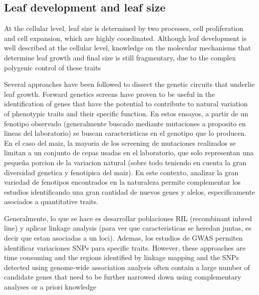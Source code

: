 \documentclass[a4paper,10pt]{article}
\begin{document}
\subsection{Leaf development and leaf size}

At the cellular level, leaf size is determined by two processes, cell proliferation and cell expansion, which are highly coordinated.
Although leaf development is well described at the cellular level, knowledge on the molecular mechanisms that determine leaf growth and final size is still fragmentary, due to the complex polygenic control of these traits

Several approaches have been followed to dissect the genetic circuits that underlie leaf growth.
Forward genetics screens have proven to be useful in the identification of genes that have the potential to contribute to natural variation of phenotypic traits and their specific function. 
En estos ensayos, a partir de un fenotipo observado (generalmente buscado mediante mutaciones a proposito en lineas del laboratorio) se buscan caracteristicas en el genotipo que lo producen.
En el caso del maiz, la mayoria de los screening de mutaciones realizados se limitan a un conjunto de cepas usadas en el laboratorio, que solo representan una pequeña porcion de la variacion natural (sobre todo teniendo en cuenta la gran diversidad genetica y fenotipica del maiz). 
En este contexto, analizar la gran variedad de fenotipos encontrados en la naturaleza permite complementar los estudios identificando una gran cantidad de nuevos genes y alelos, especificamente asociados a quantitative traits.

Generalmente, lo que se hace es desarrollar poblaciones RIL (recombinant inbred line) y aplicar linkage analysis (para ver que caracteristicas se heredan juntas, es decir que estan asociadas a un loci). 
Ademas, los estudios de GWAS permiten identificar variaciones SNPs para specific traits. 
However, these approaches are time consuming and the regions identified by linkage mapping and the SNPs detected using genome-wide association analysis often contain a large number
of candidate genes that need to be further narrowed down using complementary analyses or a priori knowledge
\end{document}
